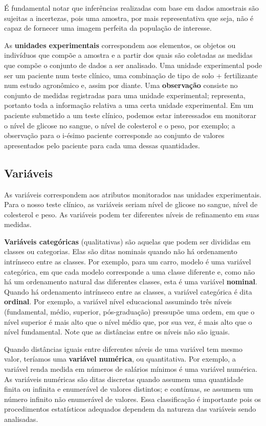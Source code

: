 \documentclass[
]{book}
\theoremstyle{definition}
\theoremstyle{definition}
\theoremstyle{definition}
\theoremstyle{remark}
\begin{document}
É fundamental notar que inferências realizadas com base em dados amostrais são sujeitas a incertezas, pois uma amostra, por mais representativa que seja, não é capaz de fornecer uma imagem perfeita da população de interesse.

As \textbf{unidades experimentais} correspondem aos elementos, os objetos ou indivíduos que compõe a amostra e a partir dos quais são coletadas as medidas que compõe o conjunto de dados a ser analisado. Uma unidade experimental pode ser um paciente num teste clínico, uma combinação de tipo de solo + fertilizante num estudo agronômico e, assim por diante. Uma \textbf{observação} consiste no conjunto de medidas registradas para uma unidade experimental; representa, portanto toda a informação relativa a uma certa unidade experimental. Em um paciente submetido a um teste clínico, podemos estar interessados em monitorar o nível de glicose no sangue, o nível de colesterol e o peso, por exemplo; a observação para o i-ésimo paciente corresponde ao conjunto de valores apresentados pelo paciente para cada uma dessas quantidades.

\hypertarget{variuxe1veis}{%
\subsection*{Variáveis}\label{variuxe1veis}}

As variáveis correspondem aos atributos monitorados nas unidades experimentais.
Para o nosso teste clínico, as variáveis seriam nível de glicose no sangue, nível de colesterol e peso. As variáveis podem ter diferentes níveis de refinamento em suas medidas.

\textbf{Variáveis categóricas} (qualitativas) são aquelas que podem ser divididas em classes ou categorias. Elas são ditas nominais quando não há ordenamento intrínseco entre as classes. Por exemplo, para um carro, modelo é uma variável categórica, em que cada modelo corresponde a uma classe diferente e, como não há um ordenamento natural das diferentes classes, esta é uma variável \textbf{nominal}. Quando há ordenamento intrínseco entre as classes, a variável categórica é dita \textbf{ordinal}. Por exemplo, a variável nível educacional assumindo três níveis (fundamental, médio, superior, pós-graduação) pressupõe uma ordem, em que o nível superior é mais alto que o nível médio que, por sua vez, é mais alto que o nível fundamental. Note que as distâncias entre os níveis não são iguais.

Quando distâncias iguais entre diferentes níveis de uma variável tem mesmo valor, teríamos uma \textbf{variável numérica}, ou quantitativa. Por exemplo, a variável renda medida em números de salários mínimos é uma variável numérica. As variáveis numéricas são ditas discretas quando assumem uma quantidade finita ou infinita e enumerável de valores distintos; e contínuas, se assumem um número infinito não enumerável de valores. Essa classificação é importante pois os procedimentos estatísticos adequados dependem da natureza das variáveis sendo analisadas.
\end{document}
